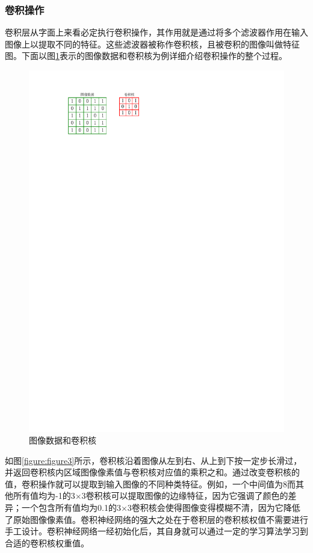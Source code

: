 \subsubsection{卷积操作}
卷积层从字面上来看必定执行卷积操作，其作用就是通过将多个滤波器作用在输入图像上以提取不同的特征。这些滤波器被称作卷积核，且被卷积的图像叫做特征图。下面以图\ref{figure:figure2}表示的图像数据和卷积核为例详细介绍卷积操作的整个过程。

\begin{figure}[htbp]
    \begin{center}
    \includegraphics{figures/conv.pdf}
    \end{center}
    \caption{图像数据和卷积核}\label{figure:figure2}
\end{figure}


如图\ref{figure:figure3}所示，卷积核沿着图像从左到右、从上到下按一定步长滑过，并返回卷积核内区域图像像素值与卷积核对应值的乘积之和。通过改变卷积核的值，卷积操作就可以提取到输入图像的不同种类特征。例如，一个中间值为8而其他所有值均为-1的3$\times$3卷积核可以提取图像的边缘特征，因为它强调了颜色的差异；一个包含所有值均为0.1的3$\times$3卷积核会使得图像变得模糊不清，因为它降低了原始图像像素值。卷积神经网络的强大之处在于卷积层的卷积核权值不需要进行手工设计。卷积神经网络一经初始化后，其自身就可以通过一定的学习算法学习到合适的卷积核权重值。

